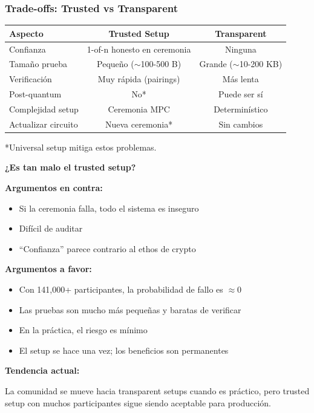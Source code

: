 \documentclass[11pt,a4paper,twoside,openright]{book}
\theoremstyle{definition}
\theoremstyle{plain}
\theoremstyle{remark}
\begin{document}
\subsubsection{Trade-offs: Trusted vs Transparent}

\begin{center}
\begin{tabular}{lcc}
\toprule
\textbf{Aspecto} & \textbf{Trusted Setup} & \textbf{Transparent} \\
\midrule
Confianza & 1-of-n honesto en ceremonia & Ninguna \\
Tamaño prueba & Pequeño ($\sim$100-500 B) & Grande ($\sim$10-200 KB) \\
Verificación & Muy rápida (pairings) & Más lenta \\
Post-quantum & No* & Puede ser sí \\
Complejidad setup & Ceremonia MPC & Determinístico \\
Actualizar circuito & Nueva ceremonia* & Sin cambios \\
\bottomrule
\end{tabular}
\end{center}

*Universal setup mitiga estos problemas.

\begin{advertencia}
\textbf{¿Es tan malo el trusted setup?}

\textbf{Argumentos en contra:}
\begin{itemize}
    \item Si la ceremonia falla, todo el sistema es inseguro
    \item Difícil de auditar
    \item ``Confianza'' parece contrario al ethos de crypto
\end{itemize}

\textbf{Argumentos a favor:}
\begin{itemize}
    \item Con 141,000+ participantes, la probabilidad de fallo es $\approx 0$
    \item Las pruebas son mucho más pequeñas y baratas de verificar
    \item En la práctica, el riesgo es mínimo
    \item El setup se hace una vez; los beneficios son permanentes
\end{itemize}

\textbf{Tendencia actual:}

La comunidad se mueve hacia transparent setups cuando es práctico, pero trusted setup con muchos participantes sigue siendo aceptable para producción.
\end{advertencia}
\end{document}
